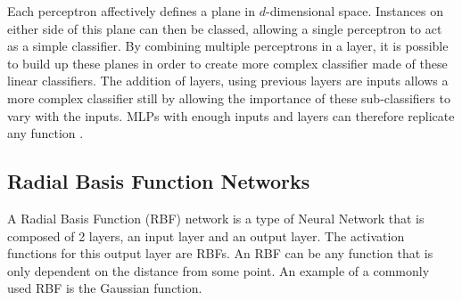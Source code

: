 Each perceptron affectively defines a plane in $d$-dimensional space. Instances on either side of this plane can then be classed, allowing a single perceptron to act as a simple classifier. By combining multiple perceptrons in a layer, it is possible to build up these planes in order to create more complex classifier made of these linear classifiers. The addition of layers, using previous layers are inputs allows a more complex classifier still by allowing the importance of these sub-classifiers to vary with the inputs. MLPs with enough inputs and layers can therefore replicate any function \cite{baum1988capabilities}.


\subsection{Radial Basis Function Networks}
A Radial Basis Function (RBF) network is a type of Neural Network that is composed of 2 layers, an input layer and an output layer. The activation functions for this output layer are RBFs. An RBF can be any function that is only dependent on the distance from some point. An example of a commonly used RBF is the Gaussian function.

